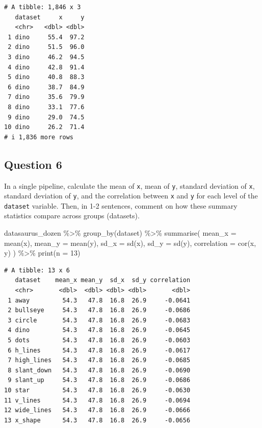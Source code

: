 \documentclass[
  letterpaper,
  DIV=11,
  numbers=noendperiod]{scrartcl}
\newenvironment{Shaded}{\begin{snugshade}}{\end{snugshade}}
\newcommand{\AttributeTok}[1]{\textcolor[rgb]{0.40,0.45,0.13}{#1}}
\newcommand{\DecValTok}[1]{\textcolor[rgb]{0.68,0.00,0.00}{#1}}
\newcommand{\FunctionTok}[1]{\textcolor[rgb]{0.28,0.35,0.67}{#1}}
\newcommand{\NormalTok}[1]{\textcolor[rgb]{0.00,0.23,0.31}{#1}}
\newcommand{\SpecialCharTok}[1]{\textcolor[rgb]{0.37,0.37,0.37}{#1}}
\begin{document}
\begin{verbatim}
# A tibble: 1,846 x 3
   dataset     x     y
   <chr>   <dbl> <dbl>
 1 dino     55.4  97.2
 2 dino     51.5  96.0
 3 dino     46.2  94.5
 4 dino     42.8  91.4
 5 dino     40.8  88.3
 6 dino     38.7  84.9
 7 dino     35.6  79.9
 8 dino     33.1  77.6
 9 dino     29.0  74.5
10 dino     26.2  71.4
# i 1,836 more rows
\end{verbatim}

\subsection{Question 6}\label{question-6}

In a single pipeline, calculate the mean of \texttt{x}, mean of
\texttt{y}, standard deviation of \texttt{x}, standard deviation of
\texttt{y}, and the correlation between \texttt{x} and \texttt{y} for
each level of the \texttt{dataset} variable. Then, in 1-2 sentences,
comment on how these summary statistics compare across groups
(datasets).

\begin{Shaded}
\begin{Highlighting}[]
\NormalTok{datasaurus\_dozen }\SpecialCharTok{\%\textgreater{}\%}
  \FunctionTok{group\_by}\NormalTok{(dataset) }\SpecialCharTok{\%\textgreater{}\%}
  \FunctionTok{summarise}\NormalTok{(}
    \AttributeTok{mean\_x =} \FunctionTok{mean}\NormalTok{(x),}
    \AttributeTok{mean\_y =} \FunctionTok{mean}\NormalTok{(y),}
    \AttributeTok{sd\_x =} \FunctionTok{sd}\NormalTok{(x),}
    \AttributeTok{sd\_y =} \FunctionTok{sd}\NormalTok{(y),}
    \AttributeTok{correlation =} \FunctionTok{cor}\NormalTok{(x, y)}
\NormalTok{  ) }\SpecialCharTok{\%\textgreater{}\%}
  \FunctionTok{print}\NormalTok{(}\AttributeTok{n =} \DecValTok{13}\NormalTok{)}
\end{Highlighting}
\end{Shaded}

\begin{verbatim}
# A tibble: 13 x 6
   dataset    mean_x mean_y  sd_x  sd_y correlation
   <chr>       <dbl>  <dbl> <dbl> <dbl>       <dbl>
 1 away         54.3   47.8  16.8  26.9     -0.0641
 2 bullseye     54.3   47.8  16.8  26.9     -0.0686
 3 circle       54.3   47.8  16.8  26.9     -0.0683
 4 dino         54.3   47.8  16.8  26.9     -0.0645
 5 dots         54.3   47.8  16.8  26.9     -0.0603
 6 h_lines      54.3   47.8  16.8  26.9     -0.0617
 7 high_lines   54.3   47.8  16.8  26.9     -0.0685
 8 slant_down   54.3   47.8  16.8  26.9     -0.0690
 9 slant_up     54.3   47.8  16.8  26.9     -0.0686
10 star         54.3   47.8  16.8  26.9     -0.0630
11 v_lines      54.3   47.8  16.8  26.9     -0.0694
12 wide_lines   54.3   47.8  16.8  26.9     -0.0666
13 x_shape      54.3   47.8  16.8  26.9     -0.0656
\end{verbatim}
\end{document}
